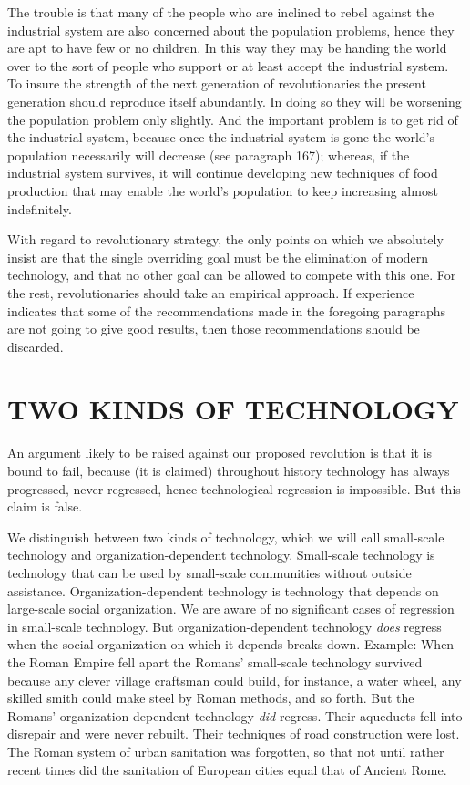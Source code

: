  The trouble is that many of the people who are inclined to rebel against the industrial system are also concerned about the population problems, hence they are apt to have few or no children. In this way they may be handing the world over to the sort of people who support or at least accept the industrial system. To insure the strength of the next generation of revolutionaries the present generation should reproduce itself abundantly. In doing so they will be worsening the population problem only slightly. And the important problem is to get rid of the industrial system, because once the industrial system is gone the world’s population necessarily will decrease (see paragraph 167); whereas, if the industrial system survives, it will continue developing new techniques of food production that may enable the world’s population to keep increasing almost indefinitely.

 With regard to revolutionary strategy, the only points on which we absolutely insist are that the single overriding goal must be the elimination of modern technology, and that no other goal can be allowed to compete with this one. For the rest, revolutionaries should take an empirical approach. If experience indicates that some of the recommendations made in the foregoing paragraphs are not going to give good results, then those recommendations should be discarded.

\chapter{TWO KINDS OF TECHNOLOGY}

 An argument likely to be raised against our proposed revolution is that it is bound to fail, because (it is claimed) throughout history technology has always progressed, never regressed, hence technological regression is impossible. But this claim is false.

 We distinguish between two kinds of technology, which we will call small-scale technology and organization-dependent technology. Small-scale technology is technology that can be used by small-scale communities without outside assistance. Organization-dependent technology is technology that depends on large-scale social organization. We are aware of no significant cases of regression in small-scale technology. But organization-dependent technology {\em does} regress when the social organization on which it depends breaks down. Example: When the Roman Empire fell apart the Romans’ small-scale technology survived because any clever village craftsman could build, for instance, a water wheel, any skilled smith could make steel by Roman methods, and so forth. But the Romans’ organization-dependent technology {\em did} regress. Their aqueducts fell into disrepair and were never rebuilt. Their techniques of road construction were lost. The Roman system of urban sanitation was forgotten, so that not until rather recent times did the sanitation of European cities equal that of Ancient Rome.

